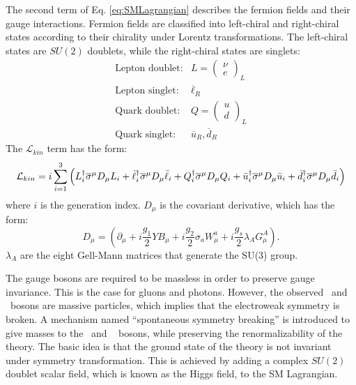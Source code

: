 \documentclass[thesis.tex]{subfiles}
\begin{document}
The second term of Eq. \ref{eq:SMLagrangian} describes the fermion fields and their gauge interactions. 
Fermion fields are classified into left-chiral and right-chiral states according to their chirality under Lorentz transformations. 
The left-chiral states are $SU(2)$ doublets, while the right-chiral states are singlets:
	\begin{equation}
		\begin{array}{cl}
		\text{Lepton doublet}: & L = \left( \begin{array}{c} \nu \\ e \end{array} \right)_L \\
		\text{Lepton singlet}:  & \overline{\ell}_{R} \\
		\text{Quark doublet}:  & Q =  \left( \begin{array}{c} u \\ d \end{array} \right)_L \\
		\text{Quark singlet}:    & \overline{u}_{R}, \overline{d}_{R}
		\end{array}
	\end{equation}
The $\mathcal{L}_{kin}$ term has the form: 
	\begin{equation}
		\mathcal{L}_{kin} = i \sum_{i = 1}^3 \left( L_i^\dagger \mathrm{\overline{\sigma}}^\mu D_\mu L_i +
									\bar{\ell}_i^\dagger \mathrm{\overline{\sigma}}^\mu D_\mu \bar{\ell}_i + 
									Q_i^\dagger \mathrm{\overline{\sigma}}^\mu D_\mu Q_i +
									\bar{u}_i^\dagger \mathrm{\overline{\sigma}}^\mu D_\mu \bar{u}_i +
									\bar{d}_i^\dagger \mathrm{\overline{\sigma}}^\mu D_\mu \bar{d}_i \right)
	\end{equation}
where $i$ is the generation index. $D_\mu$ is the covariant derivative, which has the form: 
	\begin{equation}
		D_\mu = (\partial_\mu + i \frac{g_1}{2}YB_\mu + i \frac{g_2}{2}\sigma_a W_\mu^a + i\frac{g_s}{2} \lambda_A G_\mu^{A} ).
	\end{equation}
$\lambda_A$ are the eight Gell-Mann matrices that generate the SU(3) group. 
 
The gauge bosons are required to be massless in order to preserve gauge invariance. 
This is the case for gluons and photons. 
However, the observed \PWpm~and \PZ~bosons are massive particles, which implies that the electroweak symmetry is broken. 
A mechanism named ``spontaneous symmetry breaking'' is introduced to give masses to the \PWpm~and \PZ~ bosons, while preserving the renormalizability of the theory. 
The basic idea is that the ground state of the theory is not invariant under symmetry transformation.
This is achieved by adding a complex $SU(2)$ doublet scalar field, which is known as the Higgs field, to the SM Lagrangian. 
\end{document}
